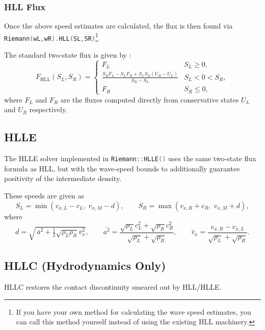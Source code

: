 \documentclass[11pt]{report}
\newcommand{\cpp}[1]{\lstinline[language=C++]{#1}}
\begin{document}
\subsubsection{HLL Flux}
Once the above speed estimates are calculated, the flux is then found via \cpp{Riemann(wL,wR).HLL(SL,SR)}\footnote{If you have your own method for calculating the wave speed estimates, you can call this method yourself instead of using the existing HLL machinery.}

The standard two-state flux is given by \citet{HartenLaxVanLeer1983}:
\begin{equation}
F_{\mathrm{HLL}}(S_L, S_R) =
\begin{cases}
F_L & S_L \ge 0, \\[4pt]
\frac{S_R F_L - S_L F_R + S_L S_R (U_R - U_L)}{S_R - S_L} & S_L < 0 < S_R, \\[8pt]
F_R & S_R \le 0,
\end{cases}
\end{equation}
where $F_L$ and $F_R$ are the fluxes computed directly from conservative states $U_L$ and $U_R$ respectively.

\subsection{HLLE} \label{sec:HLLE}

The HLLE solver implemented in \cpp{Riemann::HLLE()} uses the same two-state flux formula as HLL, but with the \citet{Einfeldt1988} wave-speed bounds to additionally guarantee positivity of the intermediate density.

These speeds are given as
\begin{equation} S_L = \min(v_{x,L} - c_L,\; v_{x,M} - d), \qquad S_R = \max(v_{x,R} + c_R,\; v_{x,M} + d),\end{equation}
where
\begin{equation}
d = \sqrt{\,\bar{a}^2 + \tfrac{1}{2}\sqrt{\rho_L\rho_R}\bar{v}_x^2}, \qquad
\bar{a^2} = \frac{\sqrt{\rho_L} c_L^2 + \sqrt{\rho_R} c_R^2}{\sqrt{\rho_L} + \sqrt{\rho_R}}, \qquad
\bar{v}_x = \frac{v_{x,R} - v_{x,L}}{\sqrt{\rho_L} + \sqrt{\rho_R}}.
\end{equation}


\subsection{HLLC (Hydrodynamics Only)}

HLLC \citep{ToroSpruceSpeares1994} restores the contact discontinuity smeared out by HLL/HLLE.
\end{document}
